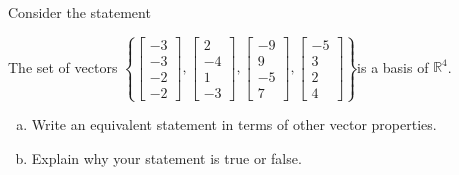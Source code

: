 
\begin{exerciseStatement}


Consider the statement 
\begin{center}\begin{minipage}{0.8\textwidth}
 The set of vectors \( \left\{ \left[\begin{array}{c}
-3 \\
-3 \\
-2 \\
-2
\end{array}\right] , \left[\begin{array}{c}
2 \\
-4 \\
1 \\
-3
\end{array}\right] , \left[\begin{array}{c}
-9 \\
9 \\
-5 \\
7
\end{array}\right] , \left[\begin{array}{c}
-5 \\
3 \\
2 \\
4
\end{array}\right] \right\} \)is a basis of \(\mathbb{R}^4\). 
\end{minipage}\end{center}
    


\begin{enumerate}[(a)]
\item  Write an equivalent statement in terms of other vector properties.
\item  Explain why your statement is true or false.
\end{enumerate}
    
\end{exerciseStatement}
    
